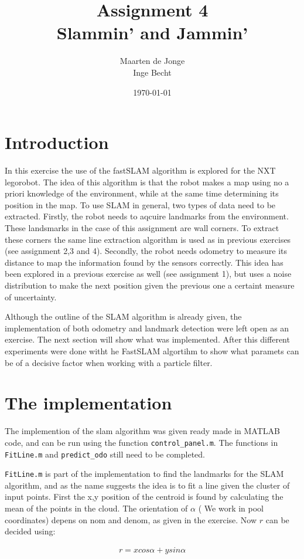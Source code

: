 \documentclass[a4paper, 12pt]{article}
\author{Maarten de Jonge \\
    Inge Becht}
\date{\today}
\title{Assignment 4\\ 
Slammin' and Jammin'}
\begin{document}
\maketitle
\section{Introduction}
In this exercise the use of the fastSLAM algorithm is explored for the NXT
legorobot. The idea of this algorithm is that the robot makes a map using no a
priori knowledge of the environment,
while at the same time determining its position in the map.
To use SLAM in general, two types of data need to be extracted. Firstly, the robot needs to aqcuire landmarks from the
environment. These landsmarks in the case of this assignment are wall corners. To extract these
corners the same line extraction algorithm is used as in previous exercises (see assignment 2,3 and 4). 
Secondly, the robot needs odometry to measure its distance to map the information found by the
sensors correctly. This idea has been explored in a
previous exercise as well (see assignment 1), but uses a noise distribution to
make the next position given the previous one a certaint measure of uncertainty.

Although the outline of the SLAM algorithm is already given, the implementation
of both odometry and landmark detection were left open as an exercise. The next
section will show what was implemented. After this different experiments were
done witht he FastSLAM
algortihm to show what paramets can be of a decisive factor when working with a
particle filter.


\section{The implementation}
The implemention of the slam algorithm was given ready made in MATLAB code, and
can be run using the function \texttt{control\_panel.m}. The functions in
\texttt{FitLine.m} and \texttt{predict\_odo} still need to be completed.

\texttt{FitLine.m} is part of the implementation to find the landmarks for the
SLAM algorithm, and as the name suggests the idea is to fit a line given the
cluster of input points. First the x,y position of the centroid is found by
calculating the mean of the points in the cloud. The orientation of $\alpha$ (
We work in pool coordinates) depens on nom and denom, as given in the exercise.
Now $r$ can be decided using:

\begin{align*}
    r = x cos \alpha + y sin \alpha
\end{align*}
\end{document}
